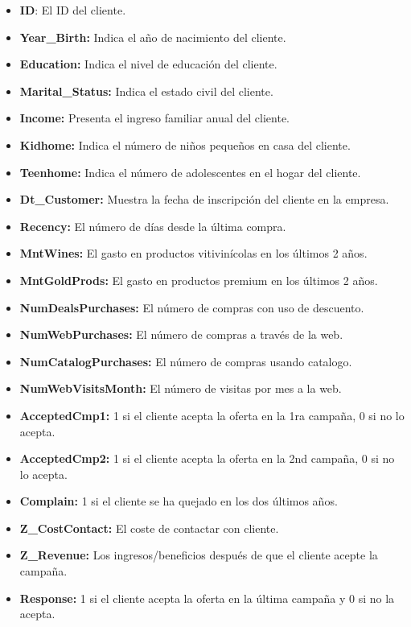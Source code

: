 \documentclass[
]{article}
\begin{document}
\begin{itemize}
\item
  \textbf{ID}: El ID del cliente.
\item
  \textbf{Year\_Birth:} Indica el año de nacimiento del cliente.
\item
  \textbf{Education:} Indica el nivel de educación del cliente.
\item
  \textbf{Marital\_Status:} Indica el estado civil del cliente.
\item
  \textbf{Income:} Presenta el ingreso familiar anual del cliente.
\item
  \textbf{Kidhome:} Indica el número de niños pequeños en casa del
  cliente.
\item
  \textbf{Teenhome:} Indica el número de adolescentes en el hogar del
  cliente.
\item
  \textbf{Dt\_Customer:} Muestra la fecha de inscripción del cliente en
  la empresa.
\item
  \textbf{Recency:} El número de días desde la última compra.
\item
  \textbf{MntWines:} El gasto en productos vitivinícolas en los últimos
  2 años.
\item
  \textbf{MntGoldProds:} El gasto en productos premium en los últimos 2
  años.
\item
  \textbf{NumDealsPurchases:} El número de compras con uso de descuento.
\item
  \textbf{NumWebPurchases:} El número de compras a través de la web.
\item
  \textbf{NumCatalogPurchases:} El número de compras usando catalogo.
\item
  \textbf{NumWebVisitsMonth:} El número de visitas por mes a la web.
\item
  \textbf{AcceptedCmp1:} 1 si el cliente acepta la oferta en la 1ra
  campaña, 0 si no lo acepta.
\item
  \textbf{AcceptedCmp2:} 1 si el cliente acepta la oferta en la 2nd
  campaña, 0 si no lo acepta.
\item
  \textbf{Complain:} 1 si el cliente se ha quejado en los dos últimos
  años.
\item
  \textbf{Z\_CostContact:} El coste de contactar con cliente.
\item
  \textbf{Z\_Revenue:} Los ingresos/beneficios después de que el cliente
  acepte la campaña.
\item
  \textbf{Response:} 1 si el cliente acepta la oferta en la última
  campaña y 0 si no la acepta.
\end{itemize}
\end{document}

